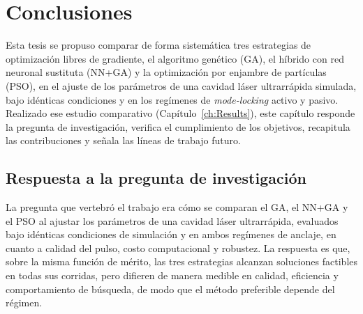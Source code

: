 
\chapter{Conclusiones}
\label{ch:Conclusions}

Esta tesis se propuso comparar de forma sistemática tres estrategias de optimización
libres de gradiente, el algoritmo genético (GA), el híbrido con red neuronal sustituta
(NN+GA) y la optimización por enjambre de partículas (PSO), en el ajuste de los
parámetros de una cavidad láser ultrarrápida simulada, bajo idénticas condiciones y en
los regímenes de \emph{mode-locking} activo y pasivo. Realizado ese estudio comparativo
(Capítulo~\ref{ch:Results}), este capítulo responde la pregunta de investigación,
verifica el cumplimiento de los objetivos, recapitula las contribuciones y señala las
líneas de trabajo futuro.

\section{Respuesta a la pregunta de investigación}
\label{sec:conc_respuesta}

La pregunta que vertebró el trabajo era cómo se comparan el GA, el NN+GA y el PSO al
ajustar los parámetros de una cavidad láser ultrarrápida, evaluados bajo idénticas
condiciones de simulación y en ambos regímenes de anclaje, en cuanto a calidad del pulso,
costo computacional y robustez. %
La respuesta es que, sobre la misma función de mérito, las tres estrategias alcanzan
soluciones factibles en todas sus corridas, pero difieren de manera medible en calidad,
eficiencia y comportamiento de búsqueda, de modo que el método preferible depende del
régimen.


